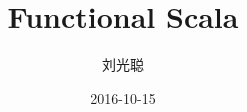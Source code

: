 
\title[Functional Scala]
{Functional Scala}

\subtitle{}

\author[Horance Liu] %
{ 刘光聪%
}

\institute[] %
{
}

\date[2016.10]{2016-10-15}
